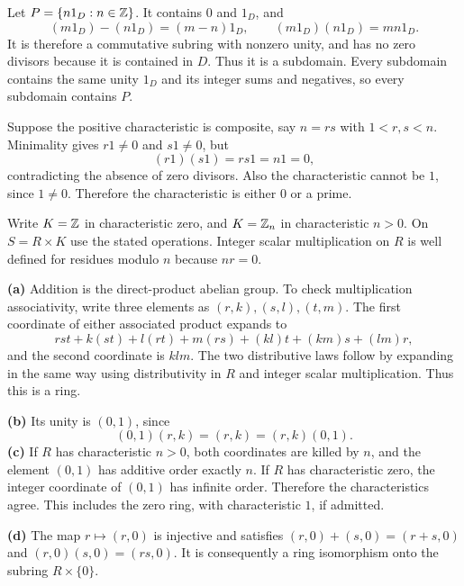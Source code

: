 Let $P=\{n1_D:n\in\mathbb{Z}\}$. It contains $0$ and $1_D$, and
\[(m1_D)-(n1_D)=(m-n)1_D,\qquad (m1_D)(n1_D)=mn1_D.
\]
It is therefore a commutative subring with nonzero unity, and has no zero divisors because it is contained in $D$. Thus it is a subdomain. Every subdomain contains the same unity $1_D$ and its integer sums and negatives, so every subdomain contains $P$.

Suppose the positive characteristic is composite, say $n=rs$ with $1<r,s<n$. Minimality gives $r1\ne0$ and $s1\ne0$, but
\[(r1)(s1)=rs1=n1=0,
\]
contradicting the absence of zero divisors. Also the characteristic cannot be $1$, since $1\ne0$. Therefore the characteristic is either $0$ or a prime.

Write $K=\mathbb{Z}$ in characteristic zero, and $K=\mathbb{Z}_n$ in characteristic $n>0$. On $S=R\times K$ use the stated operations. Integer scalar multiplication on $R$ is well defined for residues modulo $n$ because $nr=0$.\par
\textbf{(a)} Addition is the direct-product abelian group. To check multiplication associativity, write three elements as $(r,k),(s,l),(t,m)$. The first coordinate of either associated product expands to
\[rst+k(st)+l(rt)+m(rs)+(kl)t+(km)s+(lm)r,
\]
and the second coordinate is $klm$. The two distributive laws follow by expanding in the same way using distributivity in $R$ and integer scalar multiplication. Thus this is a ring.\par
\textbf{(b)} Its unity is $(0,1)$, since
\[(0,1)(r,k)=(r,k)=(r,k)(0,1).
\]
\textbf{(c)} If $R$ has characteristic $n>0$, both coordinates are killed by $n$, and the element $(0,1)$ has additive order exactly $n$. If $R$ has characteristic zero, the integer coordinate of $(0,1)$ has infinite order. Therefore the characteristics agree. This includes the zero ring, with characteristic $1$, if admitted.\par
\textbf{(d)} The map $r\mapsto(r,0)$ is injective and satisfies $(r,0)+(s,0)=(r+s,0)$ and $(r,0)(s,0)=(rs,0)$. It is consequently a ring isomorphism onto the subring $R\times\{0\}$.
